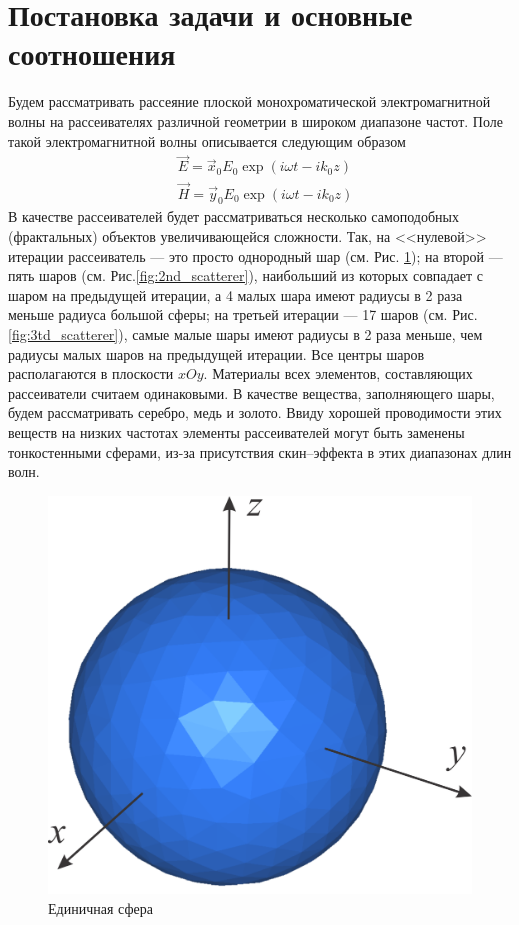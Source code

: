 \section{Постановка задачи и основные соотношения}
Будем рассматривать рассеяние плоской монохроматической электромагнитной волны на рассеивателях различной геометрии в широком диапазоне частот. Поле такой электромагнитной волны описывается следующим образом
\begin{align}
	&\vec{E}= \vec{x}_0{E}_{0} \exp (i\omega t - i k_0z)\\
	&\vec{H}= \vec{y}_0{E}_{0} \exp (i\omega t - i k_0z)
\end{align}
В качестве рассеивателей будет рассматриваться несколько самоподобных (фрактальных) объектов увеличивающейся сложности. Так, на <<нулевой>> итерации рассеиватель --- это просто однородный шар (см. Рис. \ref{fig:1st_scatterer}); на второй --- пять шаров (см. Рис.\ref{fig:2nd_scatterer}), наибольший из которых совпадает с шаром на предыдущей итерации, а 4 малых шара имеют радиусы в 2 раза меньше радиуса большой сферы; на третьей итерации --- 17 шаров (см. Рис. \ref{fig:3td_scatterer}), самые малые шары имеют радиусы в 2 раза меньше, чем радиусы малых шаров на предыдущей итерации. Все центры шаров располагаются в плоскости $xOy$. Материалы всех элементов, составляющих рассеиватели считаем одинаковыми. В качестве вещества, заполняющего шары, будем рассматривать серебро, медь и золото. Ввиду хорошей проводимости этих веществ на низких частотах элементы рассеивателей могут быть заменены тонкостенными сферами, из-за присутствия скин--эффекта в этих диапазонах длин волн.
\newpage
\begin{figure}[h!]
	\centering
	\includegraphics[width=0.4\linewidth]{1st_scatterer}
	\caption{Единичная сфера}
	\label{fig:1st_scatterer}
\end{figure}
